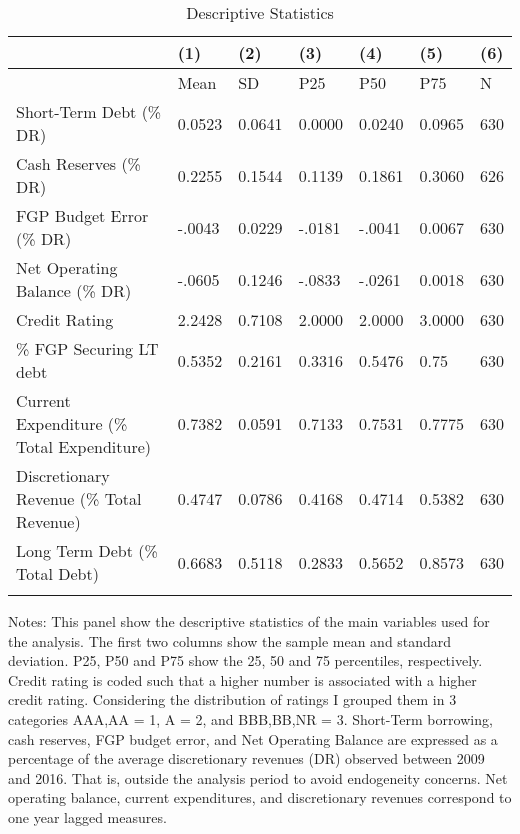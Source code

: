 \begin{table}[tbp] \centering
{}

\caption{Descriptive Statistics}
\label{tab:table1_descriptivestats}
\begin{tabularx}{\linewidth}{lCCCCCC}

\toprule
&{(1)}&{(2)}&{(3)}&{(4)}&{(5)}&{(6)} \tabularnewline \midrule
{}&{Mean}&{SD}&{P25}&{P50}&{P75}&{N} \tabularnewline
\midrule \addlinespace[\belowrulesep]
\midrule Short-Term Debt (\% DR)&0.0523&0.0641&0.0000&0.0240&0.0965&630 \tabularnewline
Cash Reserves (\% DR)&0.2255&0.1544&0.1139&0.1861&0.3060&626 \tabularnewline
FGP Budget Error (\% DR)&-.0043&0.0229&-.0181&-.0041&0.0067&630 \tabularnewline
Net Operating Balance (\% DR)&-.0605&0.1246&-.0833&-.0261&0.0018&630 \tabularnewline
Credit Rating&2.2428&0.7108&2.0000&2.0000&3.0000&630 \tabularnewline
\% FGP Securing LT debt&0.5352&0.2161&0.3316&0.5476&0.75&630 \tabularnewline
Current Expenditure (\% Total Expenditure)&0.7382&0.0591&0.7133&0.7531&0.7775&630 \tabularnewline
Discretionary Revenue (\% Total Revenue)&0.4747&0.0786&0.4168&0.4714&0.5382&630 \tabularnewline
Long Term Debt (\% Total Debt)&0.6683&0.5118&0.2833&0.5652&0.8573&630 \tabularnewline
\bottomrule \addlinespace[\belowrulesep]

\end{tabularx}
\begin{flushleft}
\footnotesize Notes: This panel show the descriptive statistics of the main variables used for the analysis. The first two columns show the sample mean and standard deviation. P25, P50 and P75 show the 25, 50 and 75 percentiles, respectively. Credit rating is coded such that a higher number is associated with a higher credit rating. Considering the distribution of ratings I grouped them in 3 categories AAA,AA = 1, A = 2, and BBB,BB,NR = 3. Short-Term borrowing, cash reserves, FGP budget error, and Net Operating Balance are expressed as a percentage of the average discretionary revenues (DR) observed between 2009 and 2016. That is, outside the analysis period to avoid endogeneity concerns. Net operating balance, current expenditures, and discretionary revenues correspond to one year lagged measures. 
\end{flushleft}
\end{table}
